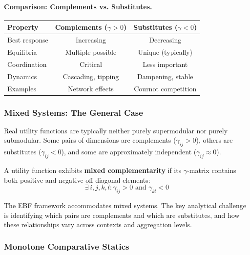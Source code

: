 \paragraph{Comparison: Complements vs. Substitutes.}
\begin{center}
\renewcommand{\arraystretch}{1.3}
\begin{tabular}{|l|c|c|}
\hline
\textbf{Property} & \textbf{Complements} ($\gamma > 0$) & \textbf{Substitutes} ($\gamma < 0$) \\
\hline
Best response & Increasing & Decreasing \\
Equilibria & Multiple possible & Unique (typically) \\
Coordination & Critical & Less important \\
Dynamics & Cascading, tipping & Dampening, stable \\
Examples & Network effects & Cournot competition \\
\hline
\end{tabular}
\end{center}

\subsubsection{Mixed Systems: The General Case}

Real utility functions are typically neither purely supermodular nor purely 
submodular. Some pairs of dimensions are complements ($\gamma_{ij} > 0$), 
others are substitutes ($\gamma_{ij} < 0$), and some are approximately 
independent ($\gamma_{ij} \approx 0$).

\begin{definition}
\label{def:mixed-system}
A utility function exhibits \textbf{mixed complementarity} if its $\gamma$-matrix 
contains both positive and negative off-diagonal elements:
\begin{equation}
    \exists \, i, j, k, l : \gamma_{ij} > 0 \text{ and } \gamma_{kl} < 0
    \label{eq:mixed-system}
\end{equation}
\end{definition}

The EBF framework accommodates mixed systems. The key analytical challenge 
is identifying which pairs are complements and which are substitutes, and how 
these relationships vary across contexts and aggregation levels.

\subsubsection{Monotone Comparative Statics}

